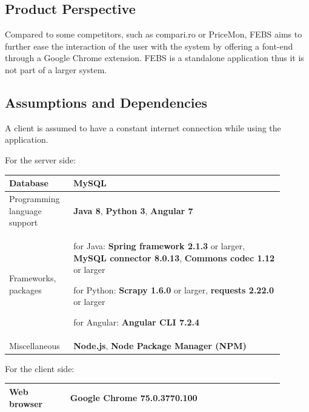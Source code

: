 \documentclass[12pt,a4paper,twoside]{report}
\begin{document}
\subsection{Product Perspective}

Compared to some competitors, such as compari.ro or PriceMon, FEBS aims to further ease the interaction of the user with the system by offering a font-end through a Google Chrome extension.
FEBS is a standalone application thus it is not part of a larger system.


\subsection{Assumptions and Dependencies}

A client is assumed to have a constant internet connection while using the application.

For the server side:

\begin{table}[H]
  \centering
  \begin{tabular}{| m{0.2\linewidth} | m{0.7\linewidth} |}
    \hline
    Database                     & \textbf{MySQL}                                                                                                              \\
    \hline
    Programming language support & \textbf{Java 8}, \textbf{Python 3}, \textbf{Angular 7}                                                                      \\
    \hline
    Frameworks, packages         & for Java: \textbf{Spring framework 2.1.3} or larger, \textbf{MySQL connector 8.0.13}, \textbf{Commons codec 1.12} or larger

    for Python: \textbf{Scrapy 1.6.0} or larger, \textbf{requests 2.22.0} or larger

    for Angular: \textbf{Angular CLI 7.2.4}                                                                                                                    \\
    \hline
    Miscellaneous                & \textbf{Node.js}, \textbf{Node Package Manager (NPM)}                                                                       \\
    \hline
  \end{tabular}
\end{table}

For the client side:

\begin{table}[H]
  \centering
  \begin{tabular}{| m{0.2\linewidth} | m{0.7\linewidth} |}
    \hline
    Web browser & \textbf{Google Chrome 75.0.3770.100} \\
    \hline
  \end{tabular}
\end{table}
\end{document}
